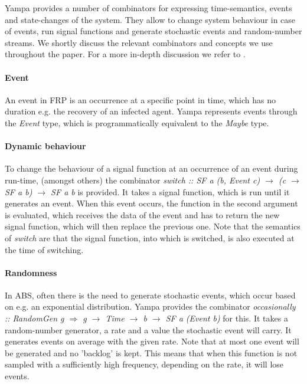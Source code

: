 Yampa provides a number of combinators for expressing time-semantics, events and state-changes of the system. They allow to change system behaviour in case of events, run signal functions and generate stochastic events and random-number streams. We shortly discuss the relevant combinators and concepts we use throughout the paper. For a more in-depth discussion we refer to \cite{hudak_arrows_2003, courtney_yampa_2003, nilsson_functional_2002}.

\paragraph{Event}
An event in FRP is an occurrence at a specific point in time, which has no duration e.g. the recovery of an infected agent. Yampa represents events through the \textit{Event} type, which is programmatically equivalent to the \textit{Maybe} type. 

\paragraph{Dynamic behaviour}
To change the behaviour of a signal function at an occurrence of an event during run-time, (amongst others) the combinator \textit{switch :: SF a (b, Event c) $\rightarrow$ (c $\rightarrow$ SF a b) $\rightarrow$ SF a b} is provided. It takes a signal function, which is run until it generates an event. When this event occurs, the function in the second argument is evaluated, which receives the data of the event and has to return the new signal function, which will then replace the previous one. Note that the semantics of \textit{switch} are that the signal function, into which is switched, is also executed at the time of switching.

\paragraph{Randomness}
In ABS, often there is the need to generate stochastic events, which occur based on e.g. an exponential distribution. Yampa provides the combinator \textit{occasionally :: RandomGen g $\Rightarrow$ g $\rightarrow$ Time $\rightarrow$ b $\rightarrow$ SF a (Event b)} for this. It takes a random-number generator, a rate and a value the stochastic event will carry. It generates events on average with the given rate. Note that at most one event will be generated and no 'backlog' is kept. This means that when this function is not sampled with a sufficiently high frequency, depending on the rate, it will lose events.

